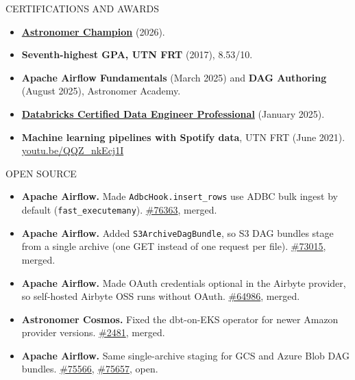 \documentclass{mcdowellcv}
\def\beforesectionheaderspace{8pt}
\begin{document}
\begin{cvsection}{CERTIFICATIONS AND AWARDS}
	\begin{cvsubsection}{}{}{}
		\begin{itemize}
			\item \textbf{\href{https://www.astronomer.io/champions/}{Astronomer Champion}} (2026).
			\item \textbf{Seventh-highest GPA, UTN FRT} (2017), 8.53/10.
			\item \textbf{Apache Airflow Fundamentals} (March 2025) and \textbf{DAG Authoring} (August 2025), Astronomer Academy.
			\item \textbf{\href{https://credentials.databricks.com/bfad361c-95cc-4989-a1c9-b460c8a2755c}{Databricks Certified Data Engineer Professional}} (January 2025).
			\item \textbf{Machine learning pipelines with Spotify data}, UTN FRT (June 2021). \href{https://youtu.be/QQZ_nkEcj1I}{youtu.be/QQZ\_nkEcj1I}
		\end{itemize}
	\end{cvsubsection}
\end{cvsection}

\def\beforesectionheaderspace{3.5pt}
\begin{cvsection}{OPEN SOURCE}
	\begin{cvsubsection}{}{}{}
		\begin{itemize}
			\item \textbf{Apache Airflow.} Made \texttt{AdbcHook.insert\_rows} use ADBC bulk ingest by default (\texttt{fast\_executemany}). \href{https://github.com/apache/airflow/pull/76363}{\#76363}, merged.
			\item \textbf{Apache Airflow.} Added \texttt{S3ArchiveDagBundle}, so S3 DAG bundles stage from a single archive (one GET instead of one request per file). \href{https://github.com/apache/airflow/pull/73015}{\#73015}, merged.
			\item \textbf{Apache Airflow.} Made OAuth credentials optional in the Airbyte provider, so self-hosted Airbyte OSS runs without OAuth. \href{https://github.com/apache/airflow/pull/64986}{\#64986}, merged.
			\item \textbf{Astronomer Cosmos.} Fixed the dbt-on-EKS operator for newer Amazon provider versions. \href{https://github.com/astronomer/astronomer-cosmos/pull/2481}{\#2481}, merged.
			\item \textbf{Apache Airflow.} Same single-archive staging for GCS and Azure Blob DAG bundles. \href{https://github.com/apache/airflow/pull/75566}{\#75566}, \href{https://github.com/apache/airflow/pull/75657}{\#75657}, open.
		\end{itemize}
	\end{cvsubsection}
\end{cvsection}
\end{document}
